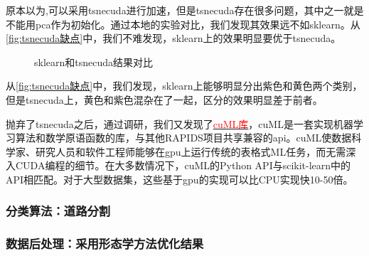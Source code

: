 \documentclass[12pt,hyperref,a4paper,UTF8]{ctexart}
\begin{document}
{\par
原本以为,可以采用tsnecuda进行加速，但是tsnecuda存在很多问题，其中之一就是不能用pca作为初始化。通过本地的实验对比，我们发现其效果远不如sklearn。从\autoref{fig:tsnecuda缺点}中，我们不难发现，sklearn上的效果明显要优于tsnecuda。
\begin{figure}[htbp]
	\centering
	\caption{sklearn和tsnecuda结果对比}
	\label{fig:tsnecuda缺点}
\end{figure}

从\autoref{fig:tsnecuda缺点}中，我们发现，sklearn上能够明显分出紫色和黄色两个类别，但是tsnecuda上，黄色和紫色混杂在了一起，区分的效果明显差于前者。

\par
抛弃了tsnecuda之后，通过调研，我们又发现了\href{https://github.com/rapidsai/cuml}{\textcolor{red}{cuML库}}，cuML是一套实现机器学习算法和数学原语函数的库，与其他RAPIDS项目共享兼容的api。cuML使数据科学家、研究人员和软件工程师能够在gpu上运行传统的表格式ML任务，而无需深入CUDA编程的细节。在大多数情况下，cuML的Python API与scikit-learn中的API相匹配。对于大型数据集，这些基于gpu的实现可以比CPU实现快10-50倍。




\subsubsection{分类算法：道路分割}


\subsubsection{数据后处理：采用形态学方法优化结果}


}
\end{document}
